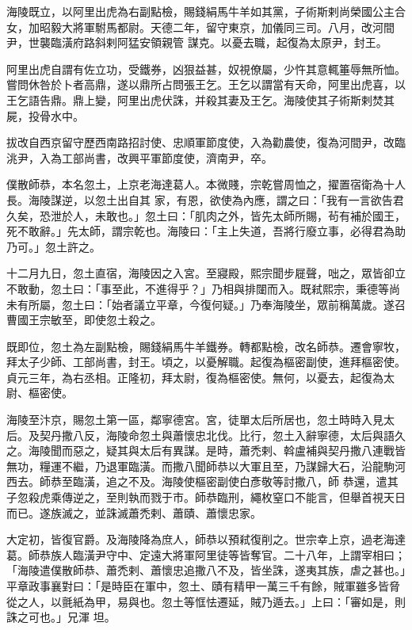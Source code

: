 \begin{pinyinscope}
 海陵既立，以阿里出虎為右副點檢，賜錢絹馬牛羊如其黨，子術斯剌尚榮國公主合女，加昭毅大將軍駙馬都尉。天德二年，留守東京，加儀同三司。八月，改河間尹，世襲臨潢府路斜剌阿猛安領親管
 謀克。以憂去職，起復為太原尹，封王。



 阿里出虎自謂有佐立功，受鐵券，凶狠益甚，奴視僚屬，少忤其意輒箠辱無所恤。嘗問休咎於卜者高鼎，遂以鼎所占問張王乞。王乞以謂當有天命，阿里出虎喜，以王乞語告鼎。鼎上變，阿里出虎伏誅，并殺其妻及王乞。海陵使其子術斯剌焚其屍，投骨水中。



 拔改自西京留守歷西南路招討使、忠順軍節度使，入為勸農使，復為河間尹，改臨洮尹，入為工部尚書，改興平軍節度使，濟南尹，卒。



 僕散師恭，本名忽土，上京老海達葛人。本微賤，宗乾嘗周恤之，擢置宿衛為十人長。海陵謀逆，以忽土出自其
 家，有恩，欲使為內應，謂之曰：「我有一言欲告君久矣，恐泄於人，未敢也。」忽土曰：「肌肉之外，皆先太師所賜，茍有補於國王，死不敢辭。」先太師，謂宗乾也。海陵曰：「主上失道，吾將行廢立事，必得君為助乃可。」忽土許之。



 十二月九日，忽土直宿，海陵因之入宮。至寢殿，熙宗聞步屣聲，咄之，眾皆卻立不敢動，忽土曰：「事至此，不進得乎？」乃相與排闥而入。既弒熙宗，秉德等尚未有所屬，忽土曰：「始者議立平章，今復何疑。」乃奉海陵坐，眾前稱萬歲。遂召曹國王宗敏至，即使忽土殺之。



 既即位，忽土為左副點檢，賜錢絹馬牛羊鐵券。轉都點檢，改名師恭。遷會寧牧，
 拜太子少師、工部尚書，封王。頃之，以憂解職。起復為樞密副使，進拜樞密使。貞元三年，為右丞相。正隆初，拜太尉，復為樞密使。無何，以憂去，起復為太尉、樞密使。



 海陵至汴京，賜忽土第一區，鄰寧德宮。宮，徒單太后所居也，忽土時時入見太后。及契丹撒八反，海陵命忽土與蕭懷忠北伐。比行，忽土入辭寧德，太后與語久之。海陵聞而惡之，疑其與太后有異謀。是時，蕭禿剌、斡盧補與契丹撒八連戰皆無功，糧運不繼，乃退軍臨潢。而撒八聞師恭以大軍且至，乃謀歸大石，沿龍駒河西去。師恭至臨潢，追之不及。海陵使樞密副使白彥敬等討撒八，師
 恭還，遣其子忽殺虎乘傳逆之，至則執而戮于市。師恭臨刑，繩枚窒口不能言，但舉首視天日而已。遂族滅之，並誅滅蕭禿剌、蕭賾、蕭懷忠家。



 大定初，皆復官爵。及海陵降為庶人，師恭以預弒復削之。世宗幸上京，過老海達葛。師恭族人臨潢尹守中、定遠大將軍阿里徒等皆奪官。二十八年，上謂宰相曰；「海陵遣僕散師恭、蕭禿剌、蕭懷忠追撒八不及，皆坐誅，遂夷其族，虐之甚也。」平章政事襄對曰：「是時臣在軍中，忽土、賾有精甲一萬三千有餘，賊軍雖多皆脅從之人，以氈紙為甲，易與也。忽土等恇怯遷延，賊乃遁去。」上曰：「審如是，則誅之可也。」兄渾
 坦。




\end{pinyinscope}
